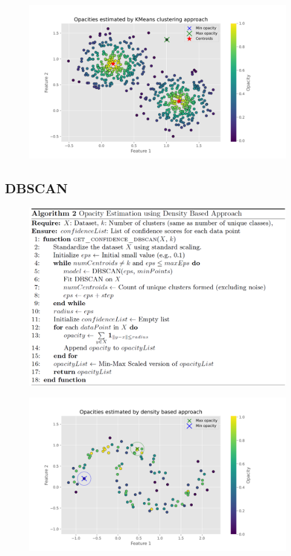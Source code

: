 \documentclass[aspectratio=169]{beamer}
\begin{document}
\begin{frame}
\begin{figure}
    \centering
    \includegraphics[width=0.78\linewidth]{../../fig/kmeans_opactiy.png}
    \label{fig:kmeans_opacity}
\end{figure}
\end{frame}

\subsection{DBSCAN}
\begin{frame}
\begin{figure}
    \centering
    \includegraphics[width=0.75\linewidth]{../../fig/alg_dbscan_opacity.png}
    \label{fig:alg_dbscan}
\end{figure}
\end{frame}

\begin{frame}
\begin{figure}
    \centering
    \includegraphics[width=0.75\linewidth]{../../fig/denisty_opactiy.png}
    \label{fig:density_opacity}
\end{figure}
\end{frame}
\end{document}
